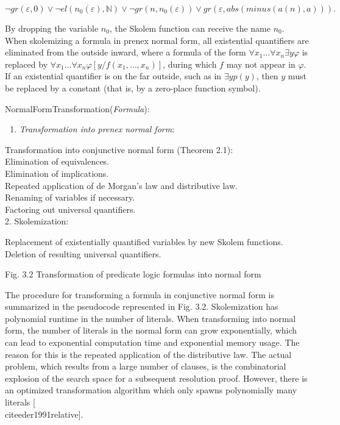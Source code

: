 \documentclass[10pt]{book}
\begin{document}
$$
\neg g r(\varepsilon, 0) \vee \neg e l\left(n_{0}(\varepsilon), \mathbb{N}\right) \vee \neg g r\left(n, n_{0}(\varepsilon)\right) \vee g r(\varepsilon, a b s(m i n u s(a(n), a))) .
$$

By dropping the variable $n_{0}$, the Skolem function can receive the name $n_{0}$.\\
When skolemizing a formula in prenex normal form, all existential quantifiers are eliminated from the outside inward, where a formula of the form $\forall x_{1} \ldots \forall x_{n} \exists y \varphi$ is replaced by $\forall x_{1} \ldots \forall x_{n} \varphi\left[y / f\left(x_{1}, \ldots, x_{n}\right)\right]$, during which $f$ may not appear in $\varphi$. If an existential quantifier is on the far outside, such as in $\exists y p(y)$, then $y$ must be replaced by a constant (that is, by a zero-place function symbol).

\begin{displayquote}
NormalFormTransformation(\textit{Formula}):

\begin{enumerate}
  \item \textit{Transformation into prenex normal form}:
\end{enumerate}
\end{displayquote}


\begin{displayquote}
Transformation into conjunctive normal form (Theorem 2.1):\\
Elimination of equivalences.\\
Elimination of implications.\\
Repeated application of de Morgan's law and distributive law.\\
Renaming of variables if necessary.\\
Factoring out universal quantifiers.\\
2. Skolemization:
\end{displayquote}

\begin{displayquote}
Replacement of existentially quantified variables by new Skolem functions.\\
Deletion of resulting universal quantifiers.
\end{displayquote}

Fig. 3.2 Transformation of predicate logic formulas into normal form

The procedure for transforming a formula in conjunctive normal form is summarized in the pseudocode represented in Fig. 3.2. Skolemization has polynomial runtime in the number of literals. When transforming into normal form, the number of literals in the normal form can grow exponentially, which can lead to exponential computation time and exponential memory usage. The reason for this is the repeated application of the distributive law. The actual problem, which results from a large number of clauses, is the combinatorial explosion of the search space for a subsequent resolution proof. However, there is an optimized transformation algorithm which only spawns polynomially many literals [\\cite{eder1991relative}].
\end{document}
